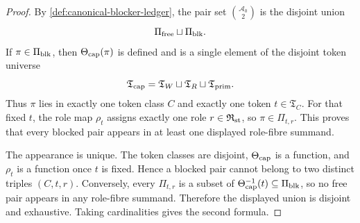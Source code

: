 \documentclass[11pt]{article}
\begin{document}
\begin{proof}
By \cref{def:canonical-blocker-ledger}, the pair set
\(\binom{\mathcal A_0}{2}\) is the disjoint union
\[
\Pi_{\rm free}\sqcup\Pi_{\rm blk}.
\]
If \(\pi\in\Pi_{\rm blk}\), then \(\Theta_{\rm cap}(\pi)\) is defined and is a
single element of the disjoint token universe
\[
\mathfrak T_{\rm cap}
=\mathfrak T_W\sqcup\mathfrak T_R\sqcup\mathfrak T_{\rm prim}.
\]
Thus \(\pi\) lies in exactly one token class \(C\) and exactly one token
\(t\in\mathfrak T_C\).  For that fixed \(t\), the role map
\(\rho_t\) assigns exactly one role \(r\in\mathfrak R_{\rm st}\), so
\(\pi\in\Pi_{t,r}\).  This proves that every blocked pair appears in at least
one displayed role-fibre summand.

The appearance is unique.  The token classes are disjoint, \(\Theta_{\rm cap}\)
is a function, and \(\rho_t\) is a function once \(t\) is fixed.  Hence a
blocked pair cannot belong to two distinct triples \((C,t,r)\).  Conversely,
every \(\Pi_{t,r}\) is a subset of \(\Theta_{\rm cap}^{-1}(t)\subseteq
\Pi_{\rm blk}\), so no free pair appears in any role-fibre summand.  Therefore
the displayed union is disjoint and exhaustive.  Taking cardinalities gives the
second formula.
\end{proof}
\end{document}
